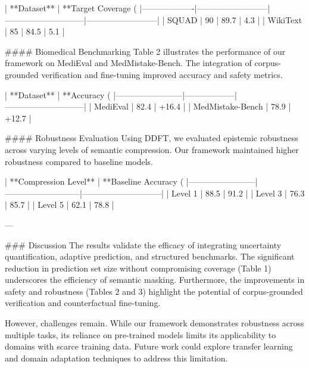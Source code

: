 | **Dataset**      | **Target Coverage (%
|-------------------|--------------------------|-----------------------------|--------------------------|  
| SQUAD            | 90                      | 89.7                       | 4.3                     |  
| WikiText         | 85                      | 84.5                       | 5.1                     |  

#### Biomedical Benchmarking  
Table 2 illustrates the performance of our framework on MediEval and MedMistake-Bench. The integration of corpus-grounded verification and fine-tuning improved accuracy and safety metrics.  

| **Dataset**           | **Accuracy (%
|------------------------|------------------|-----------------------------|  
| MediEval              | 82.4            | +16.4                       |  
| MedMistake-Bench      | 78.9            | +12.7                       |  

#### Robustness Evaluation  
Using DDFT, we evaluated epistemic robustness across varying levels of semantic compression. Our framework maintained higher robustness compared to baseline models.  

| **Compression Level** | **Baseline Accuracy (%
|------------------------|---------------------------|-----------------------------|  
| Level 1               | 88.5                     | 91.2                       |  
| Level 3               | 76.3                     | 85.7                       |  
| Level 5               | 62.1                     | 78.8                       |  

---

### Discussion  
The results validate the efficacy of integrating uncertainty quantification, adaptive prediction, and structured benchmarks. The significant reduction in prediction set size without compromising coverage (Table 1) underscores the efficiency of semantic masking. Furthermore, the improvements in safety and robustness (Tables 2 and 3) highlight the potential of corpus-grounded verification and counterfactual fine-tuning.  

However, challenges remain. While our framework demonstrates robustness across multiple tasks, its reliance on pre-trained models limits its applicability to domains with scarce training data. Future work could explore transfer learning and domain adaptation techniques to address this limitation.  

